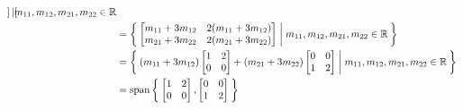 \documentclass[letterpaper,12pt]{article}
\begin{document}
\begin{enumerate}
\begin{align*}
{\begin{bmatrix}
        \end{bmatrix}
        | m_{11}, m_{12}, m_{21}, m_{22} \in \mathbb{R}
      } \\
      &= \Set{
        \begin{bmatrix}
          m_{11} + 3m_{12} & 2(m_{11} + 3m_{12}) \\
          m_{21} + 3m_{22} & 2(m_{21} + 3m_{22})
        \end{bmatrix}
        | m_{11}, m_{12}, m_{21}, m_{22} \in \mathbb{R}
      } \\
      &= \Set{
        (m_{11} + 3m_{12})\begin{bmatrix}
          1 & 2 \\
          0 & 0
        \end{bmatrix} +
        (m_{21} + 3m_{22})\begin{bmatrix}
          0 & 0 \\
          1 & 2
        \end{bmatrix}
        | m_{11}, m_{12}, m_{21}, m_{22} \in \mathbb{R}
      } \\
      &= \text{span}\Set{
        \begin{bmatrix}
          1 & 2 \\
          0 & 0
        \end{bmatrix},
        \begin{bmatrix}
          0 & 0 \\
          1 & 2
        \end{bmatrix}
      }
    \end{align*}
\end{enumerate}
\end{document}
